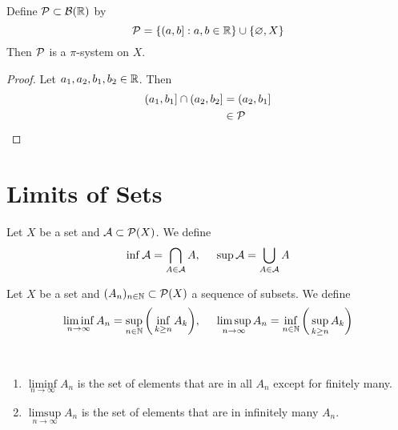 \documentclass{book}
\begin{document}
	\begin{ex} 
		Define $\mathcal{P} \subset \mathcal{B}(\mathbb{R})$ by $$\mathcal{P} = \{(a,b]: a,b \in \mathbb{R}\} \cup \{\varnothing, X\}$$
		Then $\mathcal{P}$ is a $\pi$-system on $X$.
	\end{ex}

	\begin{proof}
		Let $a_1, a_2, b_1, b_2 \in \mathbb{R}$. Then 
		\begin{align*}
			(a_1, b_1] \cap (a_2, b_2] 
			& = (a_2, b_1] \\
			& \in \mathcal{P}
		\end{align*} 
	\end{proof}


	
		
	
	
	
	
	
	
	
	
	
	
	
	
	
	
	
	
	
	
	
	
	
	
	
	
	
	
	\newpage
	\section{Limits of Sets}
	
	\begin{defn}  
		Let $X$ be a set and $\mathcal{A} \subset \mathcal{P}(X)$. We define $$\inf \mathcal{A} = \bigcap_{A \in \mathcal{A} } A ,\hspace{.5cm} \sup \mathcal{A} = \bigcup_{A \in \mathcal{A}} A$$
		
	\end{defn}
	
	\begin{defn}  
		Let $X$ be a set and $(A_n)_{n \in \mathbb{N}} \subset \mathcal{P}(X)$ a sequence of subsets. We define
		$$\liminf_{n \rightarrow \infty} A_n = \sup_{n \in \mathbb{N}} \bigg( \inf_{k \geq n}A_k \bigg), \hspace{.5cm } \limsup_{n \rightarrow \infty} A_n = \inf_{n \in \mathbb{N}} \bigg(\sup_{k \geq n}A_k \bigg)$$
	\end{defn}
	
	\begin{note}\
		\begin{enumerate}
			\item $\liminf\limits_{n \rightarrow \infty} A_n$ is the set of elements that are in all $A_n$ except for finitely many. 
			
			\item $\limsup\limits_{n \rightarrow \infty} A_n$ is the set of elements that are in infinitely many $A_n$.
		\end{enumerate}
	\end{note}
	
\end{document}
